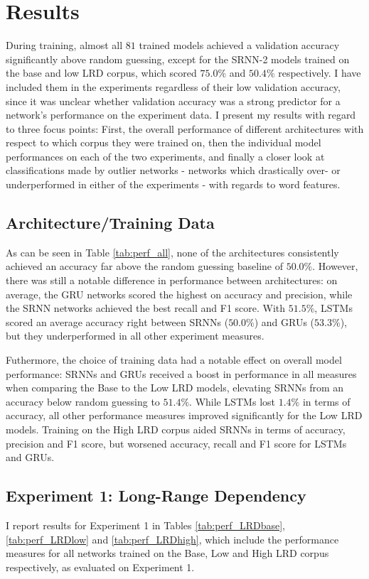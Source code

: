 \section{Results}\label{ch:results}
During training, almost all $81$ trained models achieved a validation accuracy significantly above random guessing, except for the SRNN-2 models trained on the base and low LRD corpus, which scored $75.0\%$ and $50.4\%$ respectively. I have included them in the experiments regardless of their low validation accuracy, since it was unclear whether validation accuracy was a strong predictor for a network's performance on the experiment data. I present my results with regard to three focus points: First, the overall performance of different architectures with respect to which corpus they were trained on, then the individual model performances on each of the two experiments, and finally a closer look at classifications made by outlier networks - networks which drastically over- or underperformed in either of the experiments - with regards to word features.

\subsection{Architecture/Training Data}

As can be seen in Table \ref{tab:perf_all}, none of the architectures consistently achieved an accuracy far above the random guessing baseline of $50.0\%$. However, there was still a notable difference in performance between architectures: on average, the GRU networks scored the highest on accuracy and precision, while the SRNN networks achieved the best recall and F1 score. With $51.5\%$, LSTMs scored an average accuracy right between SRNNs ($50.0\%$) and GRUs ($53.3\%$), but they underperformed in all other experiment measures.

Futhermore, the choice of training data had a notable effect on overall model performance: SRNNs and GRUs received a boost in performance in all measures when comparing the Base to the Low LRD models, elevating SRNNs from an accuracy below random guessing to $51.4\%$. While LSTMs lost $1.4\%$ in terms of accuracy, all other performance measures improved significantly for the Low LRD models. Training on the High LRD corpus aided SRNNs in terms of accuracy, precision and F1 score, but worsened accuracy, recall and F1 score for LSTMs and GRUs.

\subsection{Experiment 1: Long-Range Dependency}\label{resultsLRD}
I report results for Experiment 1 in Tables \ref{tab:perf_LRDbase}, \ref{tab:perf_LRDlow} and \ref{tab:perf_LRDhigh}, which include the performance measures for all networks trained on the Base, Low and High LRD corpus respectively, as evaluated on Experiment 1.


